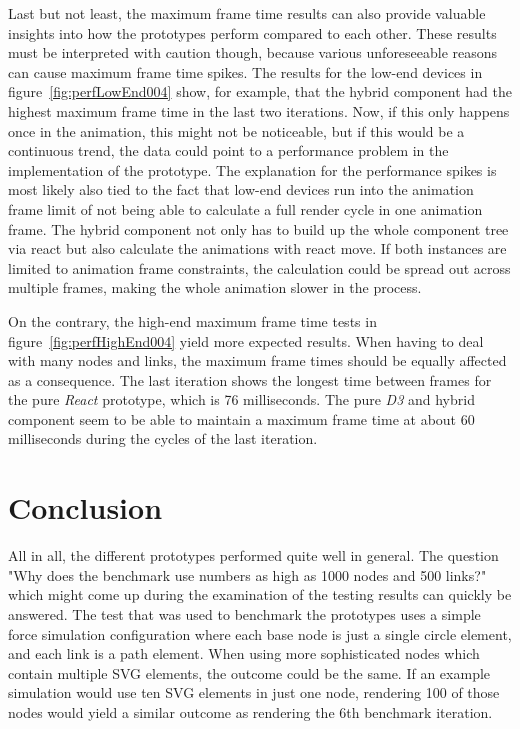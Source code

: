 Last but not least, the maximum frame time results can also provide valuable insights into how the prototypes perform compared to each other. These results must be interpreted with caution though, because various unforeseeable reasons can cause maximum frame time spikes. The results for the low-end devices in figure~\ref{fig:perfLowEnd004} show, for example, that the hybrid component had the highest maximum frame time in the last two iterations. Now, if this only happens once in the animation, this might not be noticeable, but if this would be a continuous trend, the data could point to a performance problem in the implementation of the prototype. The explanation for the performance spikes is most likely also tied to the fact that low-end devices run into the animation frame limit of not being able to calculate a full render cycle in one animation frame. The hybrid component not only has to build up the whole component tree via react but also calculate the animations with react move. If both instances are limited to animation frame constraints, the calculation could be spread out across multiple frames, making the whole animation slower in the process.

On the contrary, the high-end maximum frame time tests in figure~\ref{fig:perfHighEnd004} yield more expected results. When having to deal with many nodes and links, the maximum frame times should be equally affected as a consequence. The last iteration shows the longest time between frames for the pure \emph{React} prototype, which is 76 milliseconds. The pure \emph{D3} and hybrid component seem to be able to maintain a maximum frame time at about 60 milliseconds during the cycles of the last iteration.


\section{Conclusion}

All in all, the different prototypes performed quite well in general. The question "Why does the benchmark use numbers as high as 1000 nodes and 500 links?" which might come up during the examination of the testing results can quickly be answered. The test that was used to benchmark the prototypes uses a simple force simulation configuration where each base node is just a single circle element, and each link is a path element. When using more sophisticated nodes which contain multiple SVG elements, the outcome could be the same. If an example simulation would use ten SVG elements in just one node, rendering 100 of those nodes would yield a similar outcome as rendering the 6th benchmark iteration.

